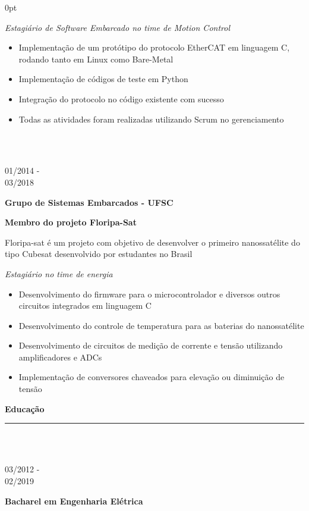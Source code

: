 \documentclass[a4paper]{article}
\begin{document}
\begin{adjustwidth}{\parindent}{0pt}
\begin{minipage}[t]{0.65\textwidth}
\begin{minipage}[t]{0.8\textwidth}
{  \large{\textit{Estagiário de Software Embarcado no time de Motion Control}}
  \begin{itemize}
    \item \normalsize{Implementação de um protótipo do protocolo EtherCAT em linguagem C, rodando tanto em Linux como Bare-Metal}
    \item \normalsize{Implementação de códigos de teste em Python}
    \item \normalsize{Integração do protocolo no código existente com sucesso}
    \item \normalsize{Todas as atividades foram realizadas utilizando Scrum no gerenciamento}
  \end{itemize}
}
\end{minipage} \\ \\

\begin{minipage}[t]{0.2\textwidth}
  \large{01/2014 - \\ 03/2018}
\end{minipage}
\begin{minipage}[t]{0.8\textwidth}
{
  \setlength{\parskip}{5.5pt}
  \Large{\textbf{Grupo de Sistemas Embarcados - UFSC}}
  
  \large{\textbf{Membro do projeto Floripa-Sat}}
  
  \large{Floripa-sat é um projeto com objetivo de desenvolver o primeiro nanossatélite do tipo Cubesat desenvolvido por estudantes no Brasil}
  
  \large{\textit{Estagiário no time de energia}}
}
\begin{itemize}
  \item \normalsize{Desenvolvimento do firmware para o microcontrolador e diversos outros circuitos integrados em linguagem C}
  \item Desenvolvimento do controle de temperatura para as baterias do nanossatélite
  \item Desenvolvimento de circuitos de medição de corrente e tensão utilizando amplificadores e ADCs
  \item Implementação de conversores chaveados para elevação ou diminuição de tensão
\end{itemize}
  
\end{minipage}

\Large{\textbf{Educação}} \normalsize \\ \rule{\textwidth}{0.5pt} \\ \\
\begin{minipage}[t]{0.2\textwidth}
\large{03/2012 - \\ 02/2019}
\end{minipage}
\begin{minipage}[t]{0.8\textwidth}
{
  \setlength{\parskip}{5.5pt}
  \Large{\textbf{Bacharel em Engenharia Elétrica}}
  
}
\end{minipage}
\end{minipage}
\end{adjustwidth}
\end{document}

